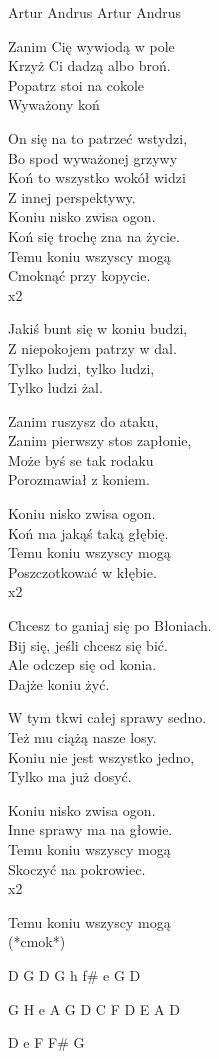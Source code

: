 {Artur Andrus}
{Artur Andrus}
\begin{text}
Zanim Cię wywiodą w pole\\
Krzyż Ci dadzą albo broń.\\
Popatrz stoi na cokole\\
Wyważony koń

On się na to patrzeć wstydzi,\\
Bo spod wyważonej grzywy \\
Koń to wszystko wokół widzi\\
Z innej perspektywy.\\

Koniu nisko zwisa ogon.\\
Koń się trochę zna na życie.\\
Temu koniu wszyscy mogą\\
Cmoknąć przy kopycie.\\
x2

Jakiś bunt się w koniu budzi,\\
Z niepokojem patrzy w dal.\\
Tylko ludzi, tylko ludzi,\\
Tylko ludzi żal.

Zanim ruszysz do ataku,\\
Zanim pierwszy stos zapłonie,\\
Może byś se tak rodaku\\
Porozmawiał z koniem.

Koniu nisko zwisa ogon.\\
Koń ma jakąś taką głębię.\\
Temu koniu wszyscy mogą\\
Poszczotkować w kłębie.\\
x2

Chcesz to ganiaj się po Błoniach.\\
Bij się, jeśli chcesz się bić.\\
Ale odczep się od konia.\\
Dajże koniu żyć.

W tym tkwi całej sprawy sedno.\\
Też mu ciążą nasze losy.\\
Koniu nie jest wszystko jedno,\\
Tylko ma już dosyć.

Koniu nisko zwisa ogon.\\
Inne sprawy ma na głowie.\\
Temu koniu wszyscy mogą\\
Skoczyć na pokrowiec.\\
x2

Temu koniu wszyscy mogą\\
(*cmok*)
\end{text}
\begin{chord}
D G
D G
h f\# e G D

G H
e A G
D C F D
E A D

D e F F\# G
\end{chord}
